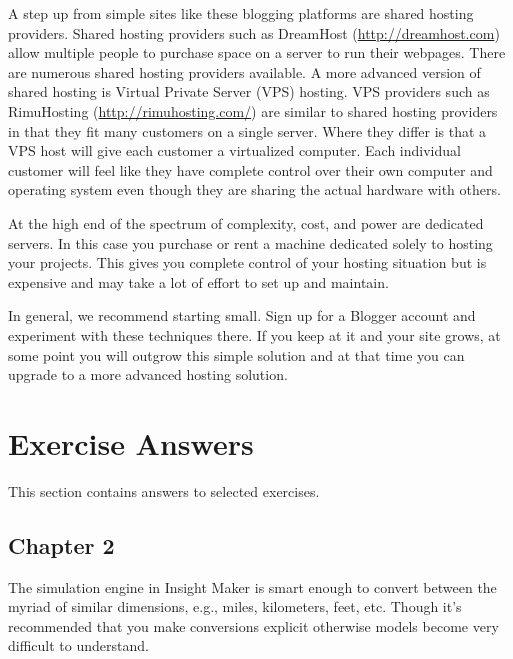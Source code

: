 \documentclass[]{memoir}
\begin{document}
A step up from simple sites like these blogging platforms are shared
hosting providers. Shared hosting providers such as DreamHost
(\url{http://dreamhost.com}) allow multiple people to purchase space on
a server to run their webpages. There are numerous shared hosting
providers available. A more advanced version of shared hosting is
Virtual Private Server (VPS) hosting. VPS providers such as RimuHosting
(\url{http://rimuhosting.com/}) are similar to shared hosting providers
in that they fit many customers on a single server. Where they differ is
that a VPS host will give each customer a virtualized computer. Each
individual customer will feel like they have complete control over their
own computer and operating system even though they are sharing the
actual hardware with others.

At the high end of the spectrum of complexity, cost, and power are
dedicated servers. In this case you purchase or rent a machine dedicated
solely to hosting your projects. This gives you complete control of your
hosting situation but is expensive and may take a lot of effort to set
up and maintain.

In general, we recommend starting small. Sign up for a Blogger account
and experiment with these techniques there. If you keep at it and your
site grows, at some point you will outgrow this simple solution and at
that time you can upgrade to a more advanced hosting solution.

\chapter{Exercise Answers}

This section contains answers to selected exercises.

\section{Chapter 2}


The simulation engine in Insight Maker is smart enough to convert
between the myriad of similar dimensions, e.g., miles, kilometers, feet,
etc. Though it's recommended that you make conversions explicit
otherwise models become very difficult to understand.
\end{document}
